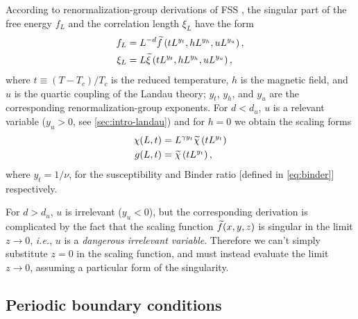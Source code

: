 According to renormalization-group derivations of FSS
\autocite{privman1983finite}, the singular part of the free energy $f_L$ and
the correlation length $\xi_L$ have the form
\begin{align}
  f_L &= L^{-d} \widetilde{f}\left(t L^{y_t}, h L^{y_h}, u L^{y_u}\right), \\
  \xi_L &= L \widetilde{\xi}\left(t L^{y_t}, h L^{y_h}, u L^{y_u}\right),
\end{align}
where $t\equiv(T-T_c)/T_c$ is the reduced temperature, $h$ is the magnetic
field, and $u$ is the quartic coupling of the Landau theory; $y_t$, $y_h$, and
$y_u$ are the corresponding renormalization-group exponents.
For $d < d_u$, $u$ is a relevant variable ($y_u > 0$, see \cref{sec:intro-landau})
and for $h=0$ we obtain the scaling forms
\begin{subequations}
\begin{align}
  \chi(L,t) &= L^{\gamma y_t} \widetilde{\chi}\left(t L^{y_t}\right)
  \label{eq:fss-standard-susc} \\
  g(L,t) &= \widetilde{\chi}\left(t L^{y_t}\right),
\end{align}
\label{eq:fss-standard}
\end{subequations}
where $y_t=1/\nu$, for the susceptibility and Binder ratio [defined in
\cref{eq:binder}] respectively.

For $d > d_u$, $u$ is irrelevant ($y_u<0$), but the corresponding derivation is
complicated by the fact that the scaling function $\widetilde{f}(x,y,z)$ is
singular in the limit $z \to 0$, \textit{i.e.}, $u$ is a \emph{dangerous
  irrelevant variable}. Therefore we can't simply substitute $z=0$ in the
scaling function, and must instead evaluate the limit $z \to 0$, assuming a
particular form of the singularity.


\subsection{Periodic boundary conditions}

